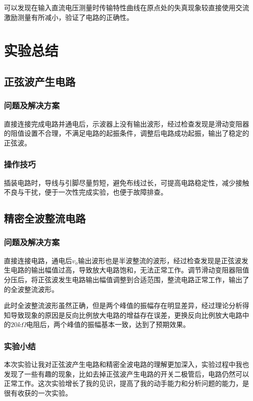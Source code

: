 \documentclass[a4paper,12pt]{article}
\begin{document}
可以发现在输入直流电压测量时传输特性曲线在原点处的失真现象较直接使用交流激励测量有所减小，验证了电路的正确性。

\section{实验总结}
\subsection{正弦波产生电路}
\subsubsection{问题及解决方案}
直接连接完成电路并通电后，示波器上没有输出波形，经过检查发现是滑动变阻器的阻值设置不合理，不满足电路的起振条件，调整后电路成功起振，输出了稳定的正弦波。

\subsubsection{操作技巧}
插装电路时，导线与引脚尽量剪短，避免布线过长，可提高电路稳定性，减少接触不良与干扰，便于一次性完成实验，也便于故障排查。

\subsection{精密全波整流电路}
\subsubsection{问题及解决方案}
直接连接电路，通电后$v_{o}$输出波形也是半波整流的波形，经过检查发现是正弦波发生电路的输出幅值过高，导致放大电路饱和，无法正常工作。调节滑动变阻器阻值分压后，将正弦波发生电路输出幅值调整到合适范围，整流电路正常工作，输出了的全波整流波形。

此时全波整流波形虽然正确，但是两个峰值的振幅存在明显差异，经过理论分析得知导致现象的原因是反向比例放大电路的增益存在误差，更换反向比例放大电路中的$20k\Omega$电阻后，两个峰值的振幅基本一致，达到了预期效果。


\subsubsection{实验小结}
本次实验让我对正弦波产生电路和精密全波电路的理解更加深入，实验过程中我也发现了一些有趣的现象，比如去掉正弦波产生电路的开关二极管后，电路仍然可以正常工作。这次实验增长了我的见识，提高了我的动手能力和分析问题的能力，是很有收获的一次实验。
\end{document}
